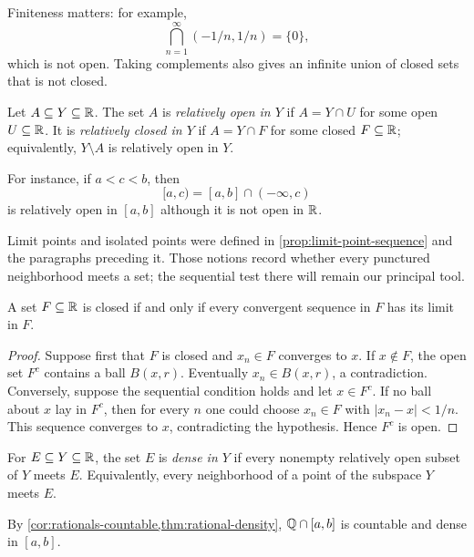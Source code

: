Finiteness matters: for example,
\[
\bigcap_{n=1}^\infty(-1/n,1/n)=\{0\},
\]
which is not open.  Taking complements also gives an infinite union of
closed sets that is not closed.

\begin{definition}
Let $A\subseteq Y\subseteq\mathbb{R}$.  The set $A$ is \emph{relatively open in
$Y$} if $A=Y\cap U$ for some open $U\subseteq\mathbb{R}$.  It is
\emph{relatively closed in $Y$} if $A=Y\cap F$ for some closed
$F\subseteq\mathbb{R}$; equivalently, $Y\setminus A$ is relatively open in $Y$.
\end{definition}
For instance, if $a<c<b$, then
\[
[a,c)=[a,b]\cap(-\infty,c)
\]
is relatively open in $[a,b]$ although it is not open in $\mathbb{R}$.

Limit points and isolated points were defined in \cref{prop:limit-point-sequence}
and the paragraphs preceding it.  Those notions record whether every
punctured neighborhood meets a set; the sequential test there will remain
our principal tool.

\begin{theorem}
\label{thm:sequentially-closed}
A set $F\subseteq\mathbb{R}$ is closed if and only if every convergent sequence in
$F$ has its limit in $F$.
\end{theorem}
\begin{proof}
Suppose first that $F$ is closed and $x_n\in F$ converges to $x$. If
$x\notin F$, the open set $F^c$ contains a ball $B(x,r)$. Eventually
$x_n\in B(x,r)$, a contradiction. Conversely, suppose the sequential
condition holds and let $x\in F^c$. If no ball about $x$ lay in $F^c$,
then for every $n$ one could choose $x_n\in F$ with $|x_n-x|<1/n$.
This sequence converges to $x$, contradicting the hypothesis. Hence $F^c$
is open.
\end{proof}

\begin{definition}
For $E\subseteq Y\subseteq\mathbb{R}$, the set $E$ is \emph{dense in $Y$} if
every nonempty relatively open subset of $Y$ meets $E$. Equivalently, every
neighborhood of a point of the subspace $Y$ meets $E$.
\end{definition}
By \cref{cor:rationals-countable,thm:rational-density},
$\mathbb{Q}\cap[a,b]$ is countable and dense in $[a,b]$.

